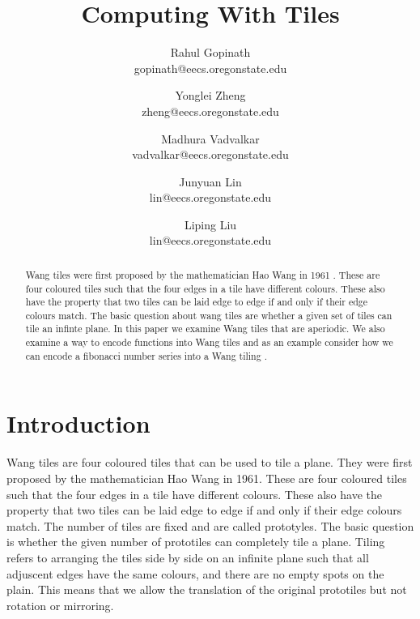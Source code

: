 \documentclass{article}
\begin{document}
\title{Computing With Tiles}
\author{
Rahul Gopinath\\
gopinath@eecs.oregonstate.edu
\and
Yonglei Zheng\\
zheng@eecs.oregonstate.edu
\and
Madhura Vadvalkar\\
vadvalkar@eecs.oregonstate.edu
\and
Junyuan Lin\\
lin@eecs.oregonstate.edu
\and
Liping Liu\\
lin@eecs.oregonstate.edu
}

\maketitle


\begin{abstract}
Wang tiles were first proposed by the mathematician Hao Wang in 1961 \cite{wang}. These are four coloured tiles such that the four edges in a tile have different colours. These also have the property that two tiles can be laid edge to edge if and only if their edge colours match. The basic question about wang tiles are whether a given set of tiles can tile an infinte plane. In this paper we examine Wang tiles that are aperiodic\cite{undecide}. We also examine a way to encode functions into Wang tiles and as an example consider how we can encode a fibonacci number series into a Wang tiling \cite{tilings}.
\end{abstract}

\section*{Introduction}
Wang tiles are four coloured tiles that can be used to tile a plane.  They were first proposed by the mathematician Hao Wang in 1961. These are four coloured tiles such that the four edges in a tile have different colours. These also have the property that two tiles can be laid edge to edge if and only if their edge colours match. The number of tiles are fixed and are called prototyles. The basic question is whether the given number of prototiles can completely tile a plane. Tiling refers to arranging the tiles side by side on an infinite plane such that all adjuscent edges have the same colours, and there are no empty spots on the plain. This means that we allow the translation of the original prototiles but not rotation or mirroring.
\end{document}
